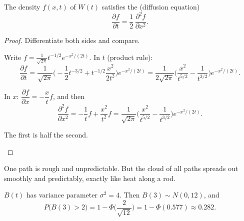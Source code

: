 \begin{result}
\label{res:heat}
The density $f(x,t)$ of $W(t)$ satisfies the  (diffusion equation)
\[
  \frac{\partial f}{\partial t}=\frac12\,\frac{\partial^2f}{\partial x^2}.
\]
\end{result}
\begin{proof}
Differentiate both sides and compare.
\begin{steps}
  \item Write $f=\frac{1}{\sqrt{2\pi}}t^{-1/2}e^{-x^2/(2t)}$. In $t$ (product rule):
  \[
    \frac{\partial f}{\partial t}=\frac{1}{\sqrt{2\pi}}\Big(-\frac12t^{-3/2}+t^{-1/2}\frac{x^2}{2t^2}\Big)e^{-x^2/(2t)}
    =\frac{1}{2\sqrt{2\pi}}\Big(\frac{x^2}{t^{5/2}}-\frac{1}{t^{3/2}}\Big)e^{-x^2/(2t)} .
  \]
  \item In $x$: $\dfrac{\partial f}{\partial x}=-\dfrac{x}{t}f$, and then
  \[
    \frac{\partial^2f}{\partial x^2}=-\frac1tf+\frac{x^2}{t^2}f=\frac{1}{\sqrt{2\pi}}\Big(\frac{x^2}{t^{5/2}}-\frac{1}{t^{3/2}}\Big)e^{-x^2/(2t)} .
  \]
  \item The first is half the second. \qedhere
\end{steps}
\end{proof}

\begin{intuition}
One path is rough and unpredictable. But the cloud of all paths spreads out smoothly and predictably, exactly like heat along a rod.
\end{intuition}

\begin{example}
$B(t)$ has variance parameter $\sigma^2=4$. Then $B(3)\sim N(0,12)$, and
\[
  P\big(B(3)>2\big)=1-\Phi\Big(\frac{2}{\sqrt{12}}\Big)=1-\Phi(0.577)\approx0.282 .
\]
\end{example}


